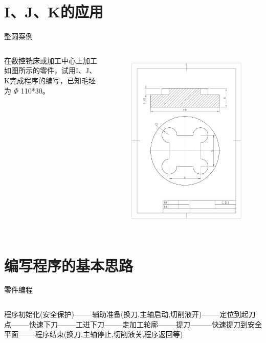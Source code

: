\documentclass[UTF8,zihao=-4]{ctexbeamer}
\begin{document}
\section{I、J、K的应用}
\begin{frame}{整圆案例}
    \begin{columns}
        在数控铣床或加工中心上加工如图所示的零件，试用I、J、K完成程序的编写，已知毛坯为 $\Phi$ 110*30。
        
        \begin{figure}
            \centering
            \includegraphics[width=0.8\linewidth,trim=50 150 50 100,clip]{image/5-4.jpg}
            \label{fig:5-4}
        \end{figure}
    \end{columns}
\end{frame}


\section{编写程序的基本思路}
\begin{frame}{零件编程}
    \begin{columns}
        \column{\textwidth}
 程序初始化(安全保护)--------辅助准备(换刀,主轴启动,切削液开)--------定位到起刀点--------快速下刀--------工进下刀--------走加工轮廓--------提刀---------快速提刀到安全平面-------程序结束(换刀,主轴停止,切削液关,程序返回等)       
        
    \end{columns}
\end{frame}
\end{document}
